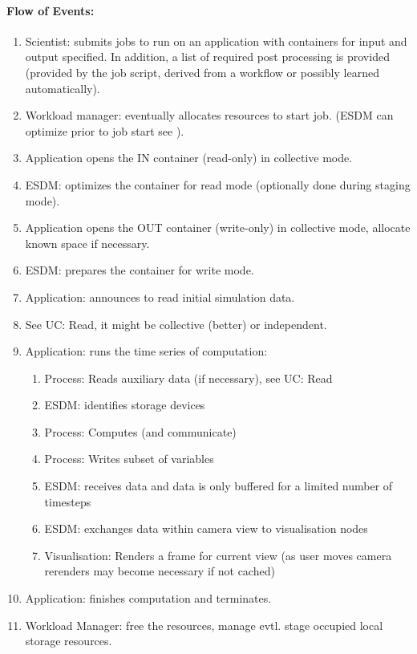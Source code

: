\paragraph{Flow of Events:}
\begin{enumerate}
	\item Scientist: submits jobs to run on an application with containers for input and output specified. In addition, a list of required post processing is provided (provided by the job script, derived from a workflow or possibly learned automatically).
	\item Workload manager: eventually allocates resources to start job. (ESDM can optimize prior to job start see ).
	\item Application opens the IN container (read-only) in collective mode.
	\item ESDM: optimizes the container for read mode (optionally done during staging mode).
	\item Application opens the OUT container (write-only) in collective mode, allocate known space if necessary.
	\item ESDM: prepares the container for write mode.
	\item Application: announces to read initial simulation data.
	\item See UC: Read, it might be collective (better) or independent.
	\item Application: runs the time series of computation:
	\begin{enumerate}
		\item Process: Reads auxiliary data (if necessary), see UC: Read
		\item ESDM: identifies storage devices
		\item Process: Computes (and communicate)
		\item Process: Writes subset of variables
		\item ESDM: receives data and data is only buffered for a limited number of timesteps
		\item ESDM: exchanges data within camera view to visualisation nodes
		\item Visualisation: Renders a frame for current view (as user moves camera rerenders may become necessary if not cached)
	\end{enumerate}
	\item Application: finishes computation and terminates.
	\item Workload Manager: free the resources, manage evtl. stage occupied local storage resources.
\end{enumerate}


